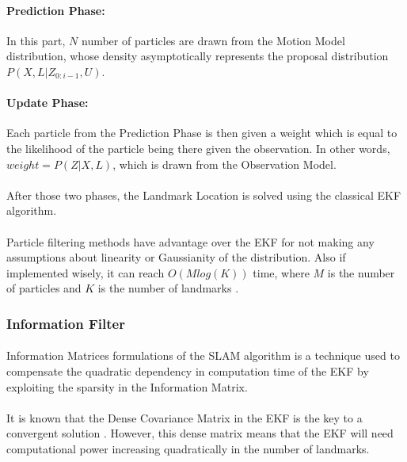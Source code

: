 \documentclass[12pt]{article}
\begin{document}
	 \paragraph{Prediction Phase:} In this part, $N$ number of particles are drawn from the Motion Model distribution, whose density asymptotically represents the proposal distribution $P(X, L | Z_{0:i-1}, U)$.
	 
	 \paragraph{Update Phase:} Each particle from the Prediction Phase is then given a weight which is equal to the likelihood of the particle being there given the observation. In other words, $weight = P(Z|X, L)$, which is drawn from the Observation Model.
	 
	 \paragraph{}
	 After those two phases, the Landmark Location is solved using the classical EKF algorithm.
	 
	 \paragraph{}
	 Particle filtering methods have advantage over the EKF for not making any assumptions about linearity or Gaussianity of the distribution. Also if implemented wisely, it can reach $O(Mlog(K))$ time, where $M$ is the number of particles and $K$ is the number of landmarks \cite{Montemerlo02fastslam:a}.
	 
	 
	
	\subsubsection{Information Filter}
	\paragraph{}
	Information Matrices formulations of the SLAM algorithm is a technique used to compensate the quadratic dependency in computation time of the EKF by exploiting the sparsity in the Information Matrix.
	\paragraph{}
	It is known that the Dense Covariance Matrix in the EKF is the key to a convergent solution \cite{SLAMPartI}. However, this dense matrix means that the EKF will need computational power increasing quadratically in the number of landmarks.
	
\end{document}

